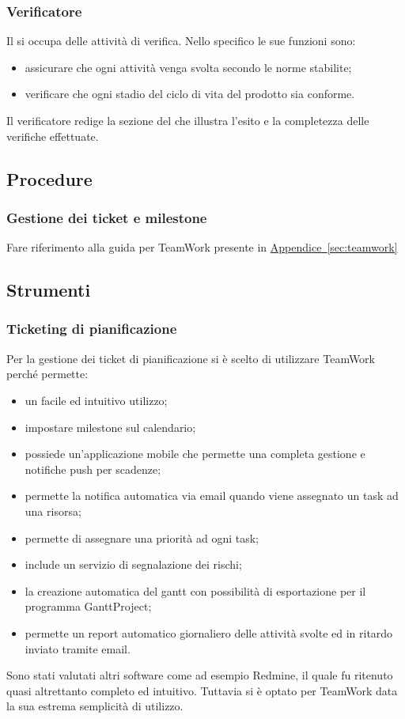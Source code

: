 		\subsubsection{Verificatore}
			Il  si occupa delle attività di verifica. Nello specifico le sue funzioni sono:
			\begin{itemize}
				\item assicurare che ogni attività venga svolta secondo le norme stabilite;
				\item verificare che ogni stadio del ciclo di vita del prodotto sia conforme.
			\end{itemize}
			Il verificatore redige la sezione del  che illustra l’esito e la completezza delle verifiche effettuate.
			\subsection{Procedure}
				\subsubsection{Gestione dei ticket e milestone}
					Fare riferimento alla guida per TeamWork presente in \hyperref[sec:teamwork]{Appendice~\ref*{sec:teamwork}}
			\subsection{Strumenti}
				\subsubsection{Ticketing di pianificazione}
					Per la gestione dei ticket di pianificazione si è scelto di utilizzare TeamWork perché permette:
					\begin{itemize}
						\item un facile ed intuitivo utilizzo;
						\item impostare milestone sul calendario;
						\item possiede un'applicazione mobile che permette una completa gestione e notifiche push per scadenze;
						\item permette la notifica automatica via email quando viene assegnato un task ad una risorsa;
						\item permette di assegnare una priorità ad ogni task;
						\item include un servizio di segnalazione dei rischi;
						\item la creazione automatica del gantt con possibilità di esportazione per il programma GanttProject;
						\item permette un report automatico giornaliero delle attività svolte ed in ritardo inviato tramite email.
					\end{itemize}
					Sono stati valutati altri software come ad esempio Redmine, il quale fu ritenuto quasi altrettanto completo ed intuitivo. Tuttavia si è optato per TeamWork data la sua estrema semplicità di utilizzo.\\